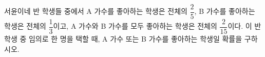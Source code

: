서윤이네 반 학생들 중에서 A 가수를 좋아하는 학생은 전체의 $\dfrac{2}{5}$, B 가수를 좋아하는 학생은 전체의 $\dfrac{1}{3}$이고, A 가수와 B 가수를 모두 좋아하는 학생은 전체의 $\dfrac{2}{15}$이다. 이 반 학생 중 임의로 한 명을 택할 때, A 가수 또는 B 가수를 좋아하는 학생일 확률을 구하시오.
